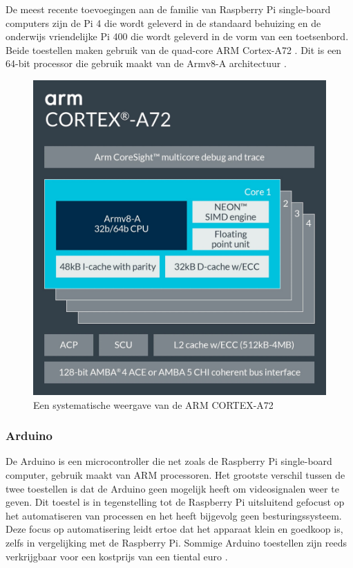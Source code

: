 De meest recente toevoegingen aan de familie van Raspberry Pi single-board computers zijn de Pi 4 die wordt geleverd in de standaard behuizing en de onderwijs vriendelijke Pi 400 die wordt geleverd in de vorm van een toetsenbord. Beide toestellen maken gebruik van de quad-core ARM Cortex-A72 \autocite{Pi2022}. Dit is een 64-bit processor die gebruik maakt van de Armv8-A architectuur \autocite{armDeveloper2022}.

\begin{figure}[!htb]
    \centering
    \includegraphics[width=\linewidth]{img/Cortex-A72.jpg}
    \caption{Een systematische weergave van de ARM CORTEX-A72 \autocite{armDeveloper2022}}
\end{figure}

\subsubsection{Arduino}
De Arduino is een microcontroller die net zoals de Raspberry Pi single-board computer, gebruik maakt van ARM processoren. Het grootste verschil tussen de twee toestellen is dat de Arduino geen mogelijk heeft om videosignalen weer te geven. Dit toestel is in tegenstelling tot de Raspberry Pi uitsluitend gefocust op het automatiseren van processen en het heeft bijgevolg geen besturingssysteem. Deze focus op automatisering leidt ertoe dat het apparaat klein en goedkoop is, zelfs in vergelijking met de Raspberry Pi. Sommige Arduino toestellen zijn reeds verkrijgbaar voor een kostprijs van een tiental euro \autocite{Arduino2018}. 

